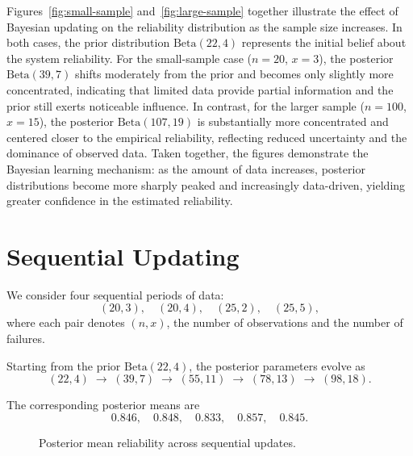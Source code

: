 \documentclass[twoside]{article}
\theoremstyle{plain}
\theoremstyle{definition}
\begin{document}
Figures~\ref{fig:small-sample} and~\ref{fig:large-sample} together illustrate the effect of Bayesian updating on the reliability distribution as the sample size increases. In both cases, the prior distribution $\mathrm{Beta}(22,4)$ represents the initial belief about the system reliability. For the small-sample case ($n=20$, $x=3$), the posterior $\mathrm{Beta}(39,7)$ shifts moderately from the prior and becomes only slightly more concentrated, indicating that limited data provide partial information and the prior still exerts noticeable influence. In contrast, for the larger sample ($n=100$, $x=15$), the posterior $\mathrm{Beta}(107,19)$ is substantially more concentrated and centered closer to the empirical reliability, reflecting reduced uncertainty and the dominance of observed data. Taken together, the figures demonstrate the Bayesian learning mechanism: as the amount of data increases, posterior distributions become more sharply peaked and increasingly data-driven, yielding greater confidence in the estimated reliability.


\section{Sequential Updating}

We consider four sequential periods of data:
\begin{equation}
(20,3), \quad (20,4), \quad (25,2), \quad (25,5),
\end{equation}
where each pair denotes $(n,x)$, the number of observations and the number of failures.

\noindent
Starting from the prior $\mathrm{Beta}(22,4)$, the posterior parameters evolve as
\begin{equation}
(22,4) \;\to\; (39,7) \;\to\; (55,11) \;\to\; (78,13) \;\to\; (98,18).
\end{equation}

\noindent
The corresponding posterior means are
\begin{equation}
0.846,\quad 0.848,\quad 0.833,\quad 0.857,\quad 0.845.
\end{equation}

\begin{figure}[h!]
\centering
{}
\caption{Posterior mean reliability across sequential updates.}
\label{fig:seq-update}
\end{figure}
\end{document}
